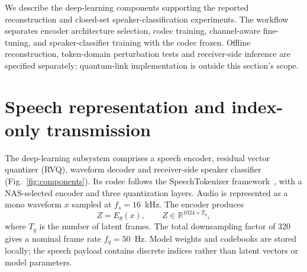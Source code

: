 We describe the deep-learning components supporting the reported reconstruction and closed-set speaker-classification experiments. The workflow separates encoder architecture selection, codec training, channel-aware fine-tuning, and speaker-classifier training with the codec frozen. Offline reconstruction, token-domain perturbation tests and receiver-side inference are specified separately; quantum-link implementation is outside this section's scope.

\section{Speech representation and index-only transmission}
The deep-learning subsystem comprises a speech encoder, residual vector quantizer (RVQ), waveform decoder and receiver-side speaker classifier (Fig.~\ref{fig:components}). Its codec follows the SpeechTokenizer framework~\cite{speechtokenizer}, with a NAS-selected encoder and three quantization layers. Audio is represented as a mono waveform $x$ sampled at $f_s=16$~kHz. The encoder produces
\begin{equation}
 Z=E_\theta(x),\qquad Z\in\mathbb{R}^{1024\times T_q},
\end{equation}
where $T_q$ is the number of latent frames. The total downsampling factor of 320 gives a nominal frame rate $f_q=50$~Hz. Model weights and codebooks are stored locally; the speech payload contains discrete indices rather than latent vectors or model parameters.

